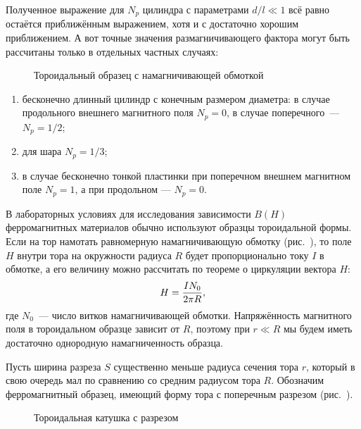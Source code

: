 Полученное выражение для $N_p$ цилиндра с параметрами $d/l \ll 1$ всё равно остаётся приближённым выражением, хотя и с достаточно хорошим приближением. А вот точные значения размагничивающего фактора могут быть рассчитаны только в отдельных частных случаях:

\begin{wrapfigure}[13]{r}{0.4\textwidth}
	\caption{Тороидальный образец с намагничивающей обмоткой}
\end{wrapfigure}

\begin{enumerate}
	\item бесконечно длинный цилиндр с конечным размером диаметра: 
в случае продольного внешнего магнитного поля $N_p = 0$, в случае 
поперечного~--- $N_p = 1/2$;

	\item для шара $ N_p = 1/3$;
	
	\item в случае бесконечно тонкой пластинки при поперечном внешнем магнитном поле $N_p = 1$, а при продольном --- $N_p = 0$.
\end{enumerate}

В лабораторных условиях для исследования зависимости $B(H)$ ферромагнитных материалов обычно используют образцы тороидальной формы. Если на тор намотать равномерную намагничивающую обмотку (рис.~), то поле $H$ внутри тора на окружности радиуса $R$ будет пропорционально току $I$ в обмотке, а его величину можно рассчитать по теореме о циркуляции вектора $H$:
\begin{equation}
	\eqmark{H-toroid}
	H = \frac{IN_0}{2\pi R},
\end{equation}
где $N_0$~--- число витков намагничивающей обмотки. Напряжённость магнитного поля в тороидальном образце зависит от $R$, поэтому при $r \ll R$ мы будем иметь достаточно однородную намагниченность образца.


Пусть ширина разреза $S$ существенно меньше радиуса сечения тора $r$, который в свою очередь мал по сравнению со средним радиусом тора $R$. Обозначим ферромагнитный образец, имеющий форму тора с поперечным разрезом (рис.~).

\begin{wrapfigure}{r}{0.4\textwidth}
	\caption{Тороидальная катушка с разрезом}
\end{wrapfigure}

